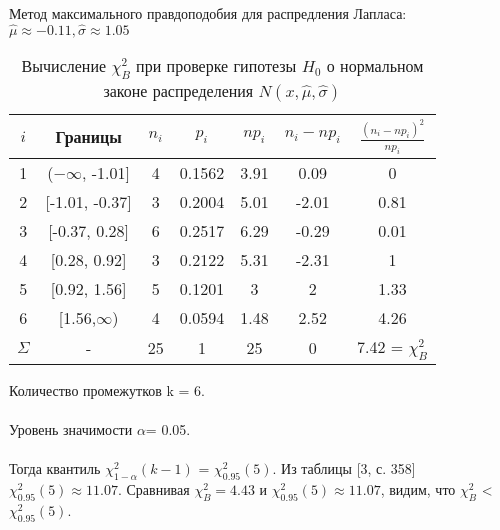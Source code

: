 \documentclass[12pt,a4paper]{scrartcl}
\begin{document}
	Метод максимального правдоподобия для распредления Лапласа:
	\newline
	$\hat{\mu} \approx -0.11, \hat{\sigma} \approx 1.05$
	
	\begin{table}[H]
	    \centering
	    \begin{tabular}{| c | c | c | c | c | c | c |}
    \hline
  $ i$ & Границы          &   $n_i$ &   $ p_i$ &   $np_i$ &  $ n_i - np_i$ &  $ \frac{(n_i - np_i)^2}{np_i} $ \\
\hline
   1 & ($-\infty$, -1.01] &     4 & 0.1562 &   3.91 &         0.09 &                          0    \\  \hline
   2 & [-1.01, -0.37]  &     3 & 0.2004 &   5.01 &        -2.01 &                          0.81 \\  \hline
   3 & [-0.37, 0.28]   &     6 & 0.2517 &   6.29 &        -0.29 &                          0.01 \\  \hline
   4 & [0.28, 0.92]    &     3 & 0.2122 &   5.31 &        -2.31 &                          1    \\  \hline
   5 & [0.92, 1.56]    &     5 & 0.1201 &   3    &         2    &                          1.33 \\  \hline
   6 & [1.56,$\infty$)   &     4 & 0.0594 &   1.48 &         2.52 &                          4.26 \\  \hline
  $ \Sigma $& -               &  25 & 1      &  25    &       0    &                    7.42 = $\chi^{2}_B$ \\  \hline
\end{tabular}
	    \caption{ Вычисление $\chi^{2}_{B}$ при проверке гипотезы $H_{0}$ о нормальном законе распределения $N(x,\hat{\mu}, \hat{\sigma})$}
	    \label{tab:Lchi_2}
\end{table}
Количество промежутков k = 6.
    \\ \\
Уровень значимости $\alpha$= 0.05.
    \\ \\
    Тогда квантиль $\chi^{2}_{1-\alpha}(k-1)$ = $\chi^{2}_{0.95}(5)$. Из таблицы [3, с. 358] $\chi^{2}_{0.95}(5) \approx 11.07$. 
Сравнивая $\chi^{2}_{B} = 4.43$ и $\chi^{2}_{0.95}(5) \approx 11.07$, видим, что $\chi^{2}_{B}$ < $\chi^{2}_{0.95}(5)$.
\end{document}

